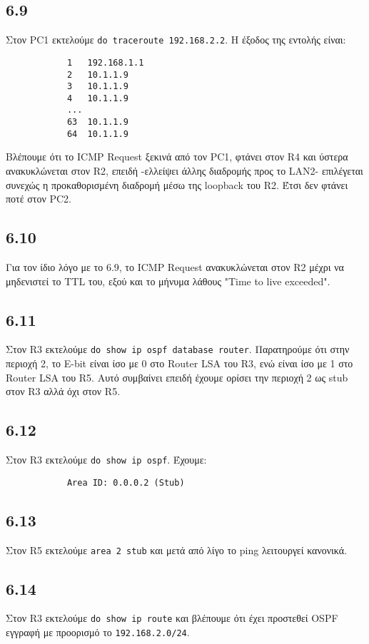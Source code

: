 \documentclass[a4paper, 12pt]{article}
\begin{document}
	\subsection*{6.9}
		Στον PC1 εκτελούμε \verb|do traceroute 192.168.2.2|. Η έξοδος της εντολής είναι:
		
		\begin{verbatim}
			1   192.168.1.1
			2   10.1.1.9
			3   10.1.1.9
			4   10.1.1.9
			...
			63  10.1.1.9
			64  10.1.1.9
		\end{verbatim}
		
		Βλέπουμε ότι το ICMP Request ξεκινά από τον PC1, φτάνει στον R4 και ύστερα ανακυκλώνεται στον R2, επειδή -ελλείψει άλλης διαδρομής προς το LAN2- επιλέγεται συνεχώς η προκαθορισμένη διαδρομή μέσω της loopback του R2. Έτσι δεν φτάνει ποτέ στον PC2.

	\subsection*{6.10}
		Για τον ίδιο λόγο με το 6.9, το ICMP Request ανακυκλώνεται στον R2 μέχρι να μηδενιστεί το TTL του, εξού και το μήνυμα λάθους "Time to live exceeded".

	\subsection*{6.11}
		Στον R3 εκτελούμε \verb|do show ip ospf database router|. Παρατηρούμε ότι στην περιοχή 2, το E-bit είναι ίσο με 0 στο Router LSA του R3, ενώ είναι ίσο με 1 στο Router LSA του R5. Αυτό συμβαίνει επειδή έχουμε ορίσει την περιοχή 2 ως stub στον R3 αλλά όχι στον R5.

	\subsection*{6.12}
		Στον R3 εκτελούμε \verb|do show ip ospf|. Έχουμε:
		
		\begin{verbatim}
			Area ID: 0.0.0.2 (Stub)
		\end{verbatim}

	\subsection*{6.13}
		Στον R5 εκτελούμε \verb|area 2 stub| και μετά από λίγο το ping λειτουργεί κανονικά.

	\subsection*{6.14}
		Στον R3 εκτελούμε \verb|do show ip route| και βλέπουμε ότι έχει προστεθεί OSPF εγγραφή με προορισμό το \verb|192.168.2.0/24|.
\end{document}
